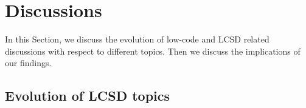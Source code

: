 \section{Discussions} \label{sec:discussion}
In this Section, we discuss the evolution of low-code and LCSD related discussions with respect to different topics. Then we discuss the implications of our findings. 


\subsection{Evolution of LCSD topics}


